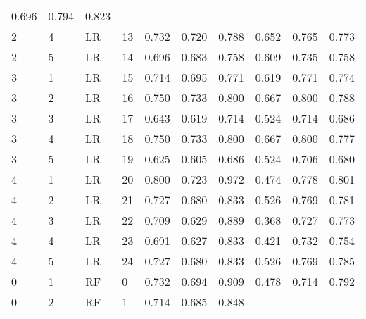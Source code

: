 \begin{table}[ht]
\begin{adjustbox}{width=\textwidth}
\begin{tabular}{llllrrrrrr}
 0.696 & 0.794 & 0.823 \\
   2 &           4 &    LR &          13 & 0.732 &  0.720 &        0.788 &      
 
 0.652 & 0.765 & 0.773 \\
   2 &           5 &    LR &          14 & 0.696 &  0.683 &        0.758 &      
 
 0.609 & 0.735 & 0.758 \\
   3 &           1 &    LR &          15 & 0.714 &  0.695 &        0.771 &      
 
 0.619 & 0.771 & 0.774 \\
   3 &           2 &    LR &          16 & 0.750 &  0.733 &        0.800 &      
 
 0.667 & 0.800 & 0.788 \\
   3 &           3 &    LR &          17 & 0.643 &  0.619 &        0.714 &      
 
 0.524 & 0.714 & 0.686 \\
   3 &           4 &    LR &          18 & 0.750 &  0.733 &        0.800 &      
 
 0.667 & 0.800 & 0.777 \\
   3 &           5 &    LR &          19 & 0.625 &  0.605 &        0.686 &      
 
 0.524 & 0.706 & 0.680 \\
   4 &           1 &    LR &          20 & 0.800 &  0.723 &        0.972 &      
 
 0.474 & 0.778 & 0.801 \\
   4 &           2 &    LR &          21 & 0.727 &  0.680 &        0.833 &      
 
 0.526 & 0.769 & 0.781 \\
   4 &           3 &    LR &          22 & 0.709 &  0.629 &        0.889 &      
 
 0.368 & 0.727 & 0.773 \\
   4 &           4 &    LR &          23 & 0.691 &  0.627 &        0.833 &      
 
 0.421 & 0.732 & 0.754 \\
   4 &           5 &    LR &          24 & 0.727 &  0.680 &        0.833 &      
 
 0.526 & 0.769 & 0.785 \\
   0 &           1 &    RF &           0 & 0.732 &  0.694 &        0.909 &      
 
 0.478 & 0.714 & 0.792 \\
   0 &           2 &    RF &           1 & 0.714 &  0.685 &        0.848 &      
 

\end{tabular}
\end{adjustbox}
\end{table}
